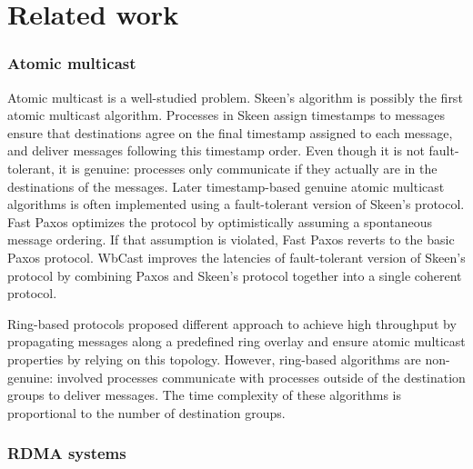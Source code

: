 \section{Related work}
\label{sec:related-work}

\subsubsection*{Atomic multicast}
Atomic multicast is a well-studied problem. Skeen’s algorithm
\cite{birman1987reliable} is possibly the first atomic multicast algorithm.
Processes in Skeen assign timestamps to messages ensure that destinations agree on the
final timestamp assigned to each message, and deliver messages following this
timestamp order. Even though it is not fault-tolerant, it is genuine: processes
only communicate if they actually are in the destinations of the messages. Later
timestamp-based genuine atomic multicast algorithms is often implemented using a
fault-tolerant version of Skeen’s protocol. Fast Paxos \cite{coelho2017fast}
optimizes the protocol by optimistically assuming a spontaneous message
ordering. If that assumption is violated, Fast Paxos reverts to the basic Paxos
protocol. WbCast \cite{gotsman2019white} improves the latencies of
fault-tolerant version of Skeen’s protocol by combining Paxos and Skeen’s
protocol together into a single coherent protocol.

Ring-based protocols \cite{delporte2000fault, bezerra2015ridge,
marandi2012multi} proposed different approach to achieve high throughput by
propagating messages along a predefined ring overlay and ensure atomic multicast
properties by relying on this topology. However, ring-based algorithms are
non-genuine: involved processes communicate with processes outside of the
destination groups to deliver messages. The time complexity of these algorithms is
proportional to the number of destination groups.

\subsubsection*{RDMA systems}


